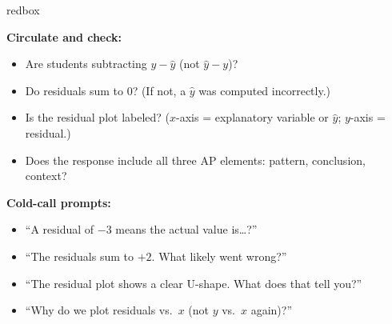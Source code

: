 \documentclass[10pt]{article}
\begin{document}
\begin{skillbox}{redbox}
\begin{minipage}[t]{0.48\linewidth}
    \textbf{Circulate and check:}
    \begin{itemize}
        \item Are students subtracting $y - \hat{y}$ (not $\hat{y} - y$)?
        \item Do residuals sum to 0? (If not, a $\hat{y}$ was computed incorrectly.)
        \item Is the residual plot labeled? ($x$-axis = explanatory variable or $\hat{y}$;
              $y$-axis = residual.)
        \item Does the response include all three AP elements: pattern, conclusion, context?
    \end{itemize}
\end{minipage}
\hfill
\begin{minipage}[t]{0.48\linewidth}
    \textbf{Cold-call prompts:}
    \begin{itemize}
        \item ``A residual of $-3$ means the actual value is\ldots?''
        \item ``The residuals sum to $+2$. What likely went wrong?''
        \item ``The residual plot shows a clear U-shape. What does that tell you?''
        \item ``Why do we plot residuals vs.\ $x$ (not $y$ vs.\ $x$ again)?''
    \end{itemize}
\end{minipage}
\end{skillbox}
\end{document}
